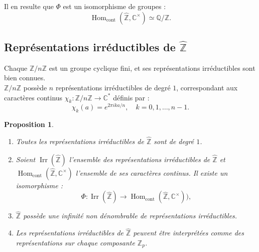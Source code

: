 \documentclass[a4paper, 14pt]{report}
\newtheorem{proposition}{Proposition}[section]
\begin{document}
\begin{onehalfspace}
{			Il en resulte que $\Phi$ est un isomorphisme de groupes :
			\[
			\operatorname{Hom}_{\text{cont}}(\widehat{\mathbb{Z}}, \mathbb{C}^\times) \simeq \mathbb{Q}/\mathbb{Z}.
			\]
			
			
			\subsection{Représentations irréductibles de $\widehat{\mathbb{Z}}$}
			Chaque $\mathbb{Z}/n\mathbb{Z}$ est un groupe cyclique fini, et ses représentations irréductibles sont bien connues.\\
			$\mathbb{Z}/n\mathbb{Z}$ possède $n$ représentations irréductibles de degré $1$, correspondant aux caractères continus $\chi_k : \mathbb{Z}/n\mathbb{Z} \to \mathbb{C}^*$ définis par :
			\[
			\chi_k(a) = e^{2\pi i k a / n}, \quad k = 0, 1, \dots, n-1.
			\]
			
			
			\begin{proposition}
				\begin{enumerate} [label=\roman*)] \
					\item Toutes les représentations irréductibles de $\widehat{\mathbb{Z}}$ sont de degré $1$.
					\item Soient $\operatorname{Irr}(\widehat{\mathbb{Z}})$ l'ensemble des représentations irréductibles de $\widehat{\mathbb{Z}}$ et $\operatorname{Hom}_{\text{cont}}(\widehat{\mathbb{Z}}, \mathbb{C}^\times)$ l'ensemble de ses caractères continus. Il existe un isomorphisme :
					\[
					\Phi : \operatorname{Irr}(\widehat{\mathbb{Z}}) \to \operatorname{Hom}_{\text{cont}}(\widehat{\mathbb{Z}}, \mathbb{C}^\times)),
					\]
					\item $\widehat{\mathbb{Z}}$ possède une infinité non dénombrable de représentations irréductibles.
					\item Les représentations irréductibles de $\widehat{\mathbb{Z}}$ peuvent être interprétées comme des représentations sur chaque composante $\mathbb{Z}_p$.
				\end{enumerate}
			\end{proposition}
			
}
\end{onehalfspace}
\end{document}

